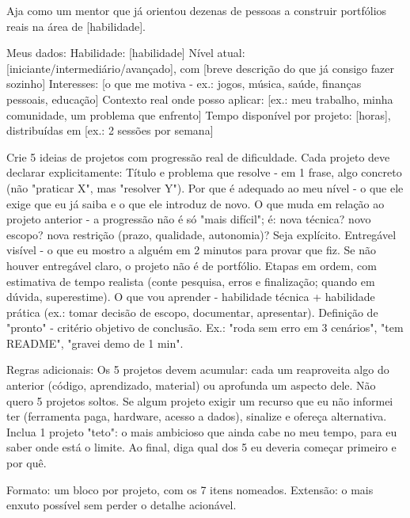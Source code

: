 \documentclass[11pt, a4paper]{article}
\begin{document}
\begin{promptbox}
Aja como um mentor que já orientou dezenas de pessoas a construir portfólios reais na área de [habilidade].

Meus dados:
 Habilidade: [habilidade]
 Nível atual: [iniciante/intermediário/avançado], com [breve descrição do que já consigo fazer sozinho]
 Interesses: [o que me motiva - ex.: jogos, música, saúde, finanças pessoais, educação]
 Contexto real onde posso aplicar: [ex.: meu trabalho, minha comunidade, um problema que enfrento]
 Tempo disponível por projeto: [horas], distribuídas em [ex.: 2 sessões por semana]

Crie 5 ideias de projetos com progressão real de dificuldade. Cada projeto deve declarar explicitamente:
 Título e problema que resolve - em 1 frase, algo concreto (não "praticar X", mas "resolver Y").
 Por que é adequado ao meu nível - o que ele exige que eu já saiba e o que ele introduz de novo.
 O que muda em relação ao projeto anterior - a progressão não é só "mais difícil"; é: nova técnica? novo escopo? nova restrição (prazo, qualidade, autonomia)? Seja explícito.
 Entregável visível - o que eu mostro a alguém em 2 minutos para provar que fiz. Se não houver entregável claro, o projeto não é de portfólio.
 Etapas em ordem, com estimativa de tempo realista (conte pesquisa, erros e finalização; quando em dúvida, superestime).
 O que vou aprender - habilidade técnica + habilidade prática (ex.: tomar decisão de escopo, documentar, apresentar).
 Definição de "pronto" - critério objetivo de conclusão. Ex.: "roda sem erro em 3 cenários", "tem README", "gravei demo de 1 min".

Regras adicionais:
 Os 5 projetos devem acumular: cada um reaproveita algo do anterior (código, aprendizado, material) ou aprofunda um aspecto dele. Não quero 5 projetos soltos.
 Se algum projeto exigir um recurso que eu não informei ter (ferramenta paga, hardware, acesso a dados), sinalize e ofereça alternativa.
 Inclua 1 projeto "teto": o mais ambicioso que ainda cabe no meu tempo, para eu saber onde está o limite.
 Ao final, diga qual dos 5 eu deveria começar primeiro e por quê.

Formato: um bloco por projeto, com os 7 itens nomeados. Extensão: o mais enxuto possível sem perder o detalhe acionável.	
\end{promptbox}
\end{document}
